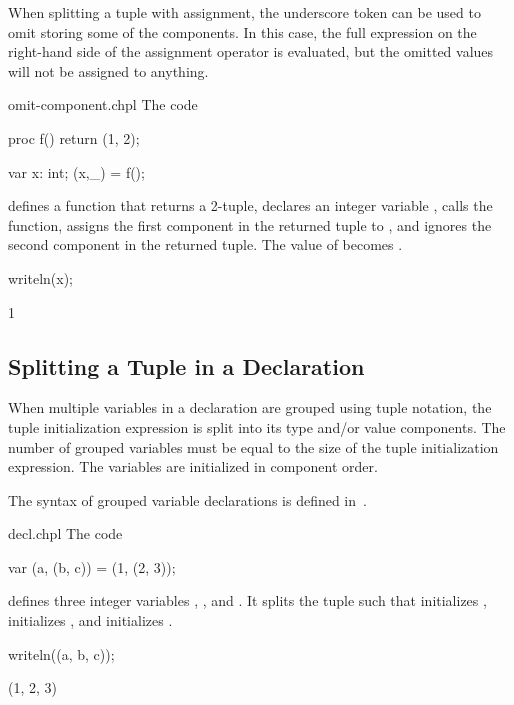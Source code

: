 When splitting a tuple with assignment, the underscore token can
be used to omit storing some of the components.  In this case, the
full expression on the right-hand side of the assignment operator is
evaluated, but the omitted values will not be assigned to anything.

\begin{chapelexample}{omit-component.chpl}
The code
\begin{chapel}
proc f()
  return (1, 2);

var x: int;
(x,_) = f();
\end{chapel}
defines a function that returns a 2-tuple, declares an integer
variable , calls the function, assigns the first component in
the returned tuple to , and ignores the second component in
the returned tuple.  The value of  becomes .
\begin{chapelpost}
writeln(x);
\end{chapelpost}
\begin{chapeloutput}
1
\end{chapeloutput}
\end{chapelexample}

\subsection{Splitting a Tuple in a Declaration}
\label{Variable_Declarations_in_a_Tuple}

When multiple variables in a declaration are grouped using tuple
notation, the tuple initialization expression is
split into its type and/or value components.  The number of grouped variables must be
equal to the size of the tuple initialization
expression.  The variables are initialized in component order.

The syntax of grouped variable declarations is defined
in~.

\begin{chapelexample}{decl.chpl}
The code
\begin{chapel}
var (a, (b, c)) = (1, (2, 3));
\end{chapel}
defines three integer variables , , and .  It
splits the tuple  such that 
initializes ,  initializes , and 
initializes .
\begin{chapelpost}
writeln((a, b, c));
\end{chapelpost}
\begin{chapeloutput}
(1, 2, 3)
\end{chapeloutput}
\end{chapelexample}

